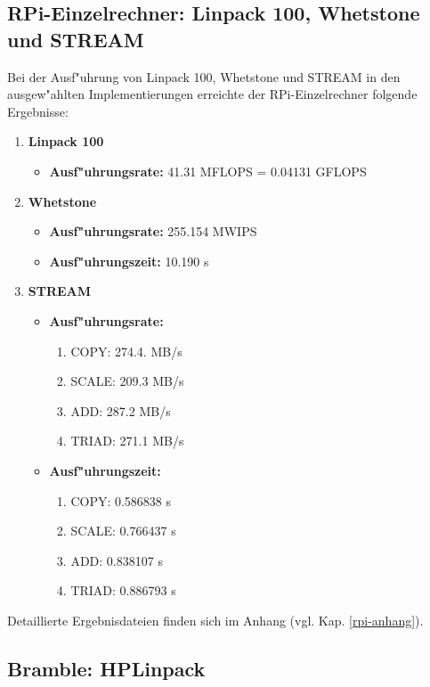 \subsection{RPi-Einzelrechner: Linpack 100, Whetstone und STREAM}\label{rpi-ergebnisse}

Bei der Ausf"uhrung von Linpack 100, Whetstone und STREAM in den ausgew"ahlten Implementierungen erreichte der RPi-Einzelrechner folgende Ergebnisse: 

\begin{enumerate}
	\item \textbf{Linpack 100} 
	\begin{itemize}
		\item \textbf{Ausf"uhrungsrate:} 41.31 MFLOPS = 0.04131 GFLOPS
	\end{itemize}
	\item \textbf{Whetstone} 
	\begin{itemize}
		\item \textbf{Ausf"uhrungsrate:} 255.154 MWIPS
		\item \textbf{Ausf"uhrungszeit:} 10.190 s  
	\end{itemize}
	\item \textbf{STREAM} 
	\begin{itemize}
		\item \textbf{Ausf"uhrungsrate:}
		\begin{enumerate}
			\item COPY: 274.4. MB/s
			\item SCALE: 209.3 MB/s
			\item ADD: 287.2 MB/s
			\item TRIAD: 271.1 MB/s
		\end{enumerate}					 
		\item \textbf{Ausf"uhrungszeit:}
		\begin{enumerate}
			\item COPY: 0.586838 s
			\item SCALE: 0.766437 s
			\item ADD: 0.838107 s
			\item TRIAD: 0.886793 s
		\end{enumerate}
	\end{itemize}
\end{enumerate} 
Detaillierte Ergebnisdateien finden sich im Anhang (vgl. Kap. \ref{rpi-anhang}). 
 
\subsection{Bramble: HPLinpack}\label{Ergebnisse-HPL}

